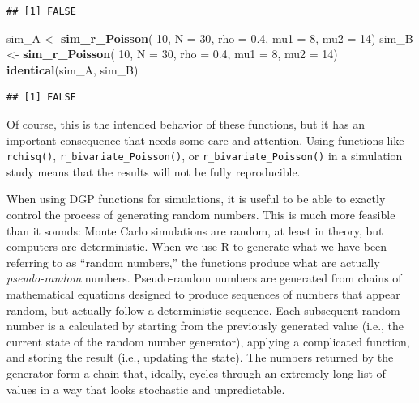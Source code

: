 \documentclass[
]{book}
\newenvironment{Shaded}{\begin{snugshade}}{\end{snugshade}}
\newcommand{\AttributeTok}[1]{\textcolor[rgb]{0.13,0.29,0.53}{#1}}
\newcommand{\DecValTok}[1]{\textcolor[rgb]{0.00,0.00,0.81}{#1}}
\newcommand{\FloatTok}[1]{\textcolor[rgb]{0.00,0.00,0.81}{#1}}
\newcommand{\FunctionTok}[1]{\textcolor[rgb]{0.13,0.29,0.53}{\textbf{#1}}}
\newcommand{\NormalTok}[1]{#1}
\newcommand{\OtherTok}[1]{\textcolor[rgb]{0.56,0.35,0.01}{#1}}
\begin{document}
\begin{verbatim}
## [1] FALSE
\end{verbatim}

\begin{Shaded}
\begin{Highlighting}[]
\NormalTok{sim\_A }\OtherTok{\textless{}{-}} \FunctionTok{sim\_r\_Poisson}\NormalTok{( }\DecValTok{10}\NormalTok{, }\AttributeTok{N =} \DecValTok{30}\NormalTok{, }\AttributeTok{rho =} \FloatTok{0.4}\NormalTok{, }\AttributeTok{mu1 =} \DecValTok{8}\NormalTok{, }\AttributeTok{mu2 =} \DecValTok{14}\NormalTok{)}
\NormalTok{sim\_B }\OtherTok{\textless{}{-}} \FunctionTok{sim\_r\_Poisson}\NormalTok{( }\DecValTok{10}\NormalTok{, }\AttributeTok{N =} \DecValTok{30}\NormalTok{, }\AttributeTok{rho =} \FloatTok{0.4}\NormalTok{, }\AttributeTok{mu1 =} \DecValTok{8}\NormalTok{, }\AttributeTok{mu2 =} \DecValTok{14}\NormalTok{)}
\FunctionTok{identical}\NormalTok{(sim\_A, sim\_B)}
\end{Highlighting}
\end{Shaded}

\begin{verbatim}
## [1] FALSE
\end{verbatim}

Of course, this is the intended behavior of these functions, but it has an important consequence that needs some care and attention.
Using functions like \texttt{rchisq()}, \texttt{r\_bivariate\_Poisson()}, or \texttt{r\_bivariate\_Poisson()} in a simulation study means that the results will not be fully reproducible.

When using DGP functions for simulations, it is useful to be able to exactly control the process of generating random numbers.
This is much more feasible than it sounds: Monte Carlo simulations are random, at least in theory, but computers are deterministic.
When we use R to generate what we have been referring to as ``random numbers,'' the functions produce what are actually \emph{pseudo-random} numbers.
Pseudo-random numbers are generated from chains of mathematical equations designed to produce sequences of numbers that appear random, but actually follow a deterministic sequence.
Each subsequent random number is a calculated by starting from the previously generated value (i.e., the current state of the random number generator), applying a complicated function, and storing the result (i.e., updating the state).
The numbers returned by the generator form a chain that, ideally, cycles through an extremely long list of values in a way that looks stochastic and unpredictable.
\end{document}
